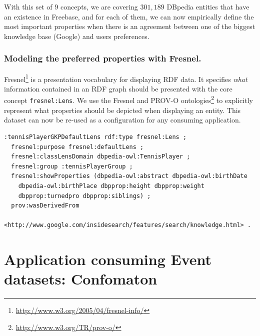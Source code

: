 \begin{table}[!htp]
\end{table}\normalsize

With this set of 9 concepts, we are covering $301,189$ DBpedia entities that have an existence in Freebase, and for each of them, we can now empirically define the most important properties when there is an agreement between one of the biggest knowledge base (Google) and users preferences.

\subsubsection{Modeling the preferred properties with Fresnel.}
\label{sec:fresnel}
Fresnel\footnote{\url{http://www.w3.org/2005/04/fresnel-info/}} is a presentation vocabulary for displaying RDF data. It specifies \textit{what} information contained in an RDF graph should be presented with the core concept \texttt{fresnel:Lens}. We use the Fresnel and PROV-O ontologies\footnote{\url{http://www.w3.org/TR/prov-o/}} to explicitly represent what properties should be depicted when displaying an entity. This dataset can now be re-used as a configuration for any consuming application.

\begin{lstlisting}
:tennisPlayerGKPDefaultLens rdf:type fresnel:Lens ;
  fresnel:purpose fresnel:defaultLens ;
  fresnel:classLensDomain dbpedia-owl:TennisPlayer ;
  fresnel:group :tennisPlayerGroup ;
  fresnel:showProperties (dbpedia-owl:abstract dbpedia-owl:birthDate
    dbpedia-owl:birthPlace dbpprop:height dbpprop:weight
    dbpprop:turnedpro dbpprop:siblings) ;
  prov:wasDerivedFrom
    <http://www.google.com/insidesearch/features/search/knowledge.html> .	
\end{lstlisting}
\normalsize

\section{Application consuming Event datasets: Confomaton}
\label{sec:confomaton}

